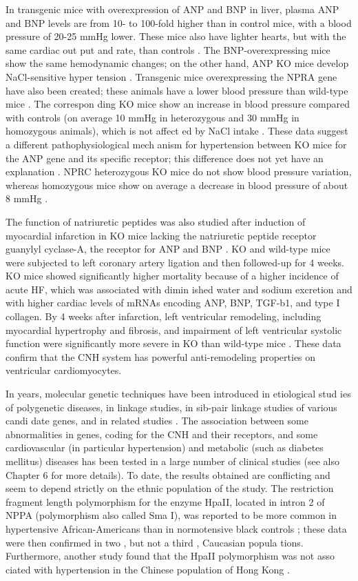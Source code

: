 \documentclass[14pt,a4paper,onecolumn]{extarticle}
\begin{document}
In transgenic mice with overexpression of ANP and BNP in liver, plasma ANP and BNP levels are from 10- to 100-fold higher than in control mice, with a blood pressure of 20-25 mmHg lower. These mice also have lighter hearts, but with the same cardiac out put and rate, than controls \citep{251} \citep{253} \citep{254} \citep{255}. The BNP-overexpressing mice show the same hemodynamic changes; on the other hand, ANP KO mice develop NaCl-sensitive hyper tension \citep{251}. Transgenic mice overexpressing the NPRA gene have also been created; these animals have a lower blood pressure than wild-type mice \citep{251}. The correspon ding KO mice show an increase in blood pressure compared with controls (on average 10 mmHg in heterozygous and 30 mmHg in homozygous animals), which is not affect ed by NaCl intake \citep{254} \citep{255}. These data suggest a different pathophysiological mech anism for hypertension between KO mice for the ANP gene and its specific receptor; this difference does not yet have an explanation \citep{251}. NPRC heterozygous KO mice do not show blood pressure variation, whereas homozygous mice show on average a decrease in blood pressure of about 8 mmHg \citep{251}.

The function of natriuretic peptides was also studied after induction of myocardial infarction in KO mice lacking the natriuretic peptide receptor guanylyl cyclase-A, the receptor for ANP and BNP \citep{89}. KO and wild-type mice were subjected to left coronary artery ligation and then followed-up for 4 weeks. KO mice showed significantly higher mortality because of a higher incidence of acute HF, which was associated with dimin ished water and sodium excretion and with higher cardiac levels of mRNAs encoding ANP, BNP, TGF-b1, and type I collagen. By 4 weeks after infarction, left ventricular remodeling, including myocardial hypertrophy and fibrosis, and impairment of left ventricular systolic function were significantly more severe in KO than wild-type mice \citep{89}. These data confirm that the CNH system has powerful anti-remodeling properties on ventricular cardiomyocytes.

In  years, molecular genetic techniques have been introduced in etiological stud ies of polygenetic diseases, in linkage studies, in sib-pair linkage studies of various candi date genes, and in related studies \citep{251} \citep{252}. The association between some abnormalities in genes, coding for the CNH and their receptors, and some cardiovascular (in particular hypertension) and metabolic (such as diabetes mellitus) diseases has been tested in a large number of clinical studies (see also Chapter 6 for more details). To date, the results obtained are conflicting and seem to depend strictly on the ethnic population of the study.  The restriction fragment length polymorphism for the enzyme HpaII, located in intron 2 of NPPA (polymorphism also called Sma I), was reported to be more common in hypertensive African-Americans than in normotensive black controls \citep{257}; these data were then confirmed in two \citep{258} \citep{259}, but not a third \citep{260}, Caucasian popula tions. Furthermore, another study found that the HpaII polymorphism was not asso ciated with hypertension in the Chinese population of Hong Kong \citep{261}.
\end{document}
